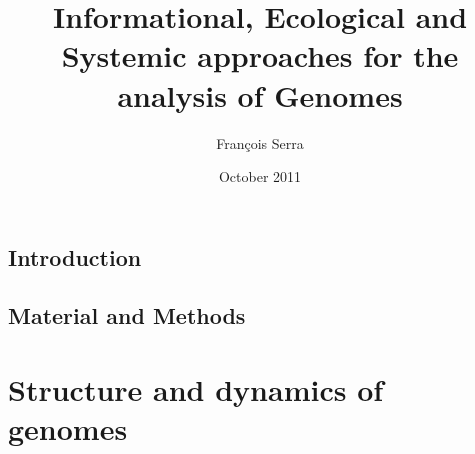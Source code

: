 \documentclass[english,b5paper,11pt]{scrbook}
\begin{document}
\author{Fran\c cois Serra}
\title{Informational, Ecological and Systemic approaches for the analysis of Genomes}
\date{October 2011}
\maketitle

\newpage
{}


{}
\newpage
\tableofcontents
\label{tableofcontents}
\begin{titlepage}
  \fancyhf{}
\end{titlepage}






\begin{titlepage}
  \fancyhf{}
\end{titlepage}





\chapter{Introduction} 
\label{intro}


\chapter{Material and Methods} 
\label{matmet}




\part{Structure and dynamics of genomes}
\end{document}

